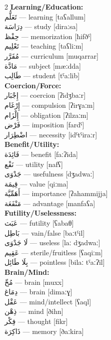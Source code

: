 \documentclass[letterpaper,12pt]{article}
\begin{document}
\begin{multicols}{2}
\textbf{Learning/Education:}\\
\textarabic{تَعَلُّم} — learning [taʕallum]\\
\textarabic{دِرَاسَة} — study [diraːsa]\\
\textarabic{حِفْظ} — memorization [ħifðˤ]\\
\textarabic{تَعْلِيم} — teaching [taʕliːm]\\
\textarabic{مُقَرَّر} — curriculum [muqarrar]\\
\textarabic{مَادَّة} — subject [mæːdda]\\
\textarabic{طَالِب} — student [tˤaːlib]\\[0.5em]

\textbf{Coercion/Force:}\\
\textarabic{إِجْبَار} — coercion [ʔidʒbaːr]\\
\textarabic{إِرْغَام} — compulsion [ʔirɣaːm]\\
\textarabic{إِلْزَام} — obligation [ʔilzaːm]\\
\textarabic{فَرْض} — imposition [fardˤ]\\
\textarabic{اضْطِرَار} — necessity [idˤtˤiraːr]\\[0.5em]

\textbf{Benefit/Utility:}\\
\textarabic{فَائِدَة} — benefit [faːʔida]\\
\textarabic{نَفْع} — utility [nafʕ]\\
\textarabic{جَدْوَى} — usefulness [dʒadwaː]\\
\textarabic{قِيمَة} — value [qiːma]\\
\textarabic{أَهَمِّيَّة} — importance [ʔahammijja]\\
\textarabic{مَنْفَعَة} — advantage [manfaʕa]\\[0.5em]

\textbf{Futility/Uselessness:}\\
\textarabic{عَبَث} — futility [ʕabaθ]\\
\textarabic{بَاطِل} — vain/false [baːtˤil]\\
\textarabic{لَا جَدْوَى} — useless [laː dʒadwaː]\\
\textarabic{عَقِيم} — sterile/fruitless [ʕaqiːm]\\
\textarabic{بِلَا طَائِل} — pointless [bilaː tˤaːʔil]\\[0.5em]

\textbf{Brain/Mind:}\\
\textarabic{مُخّ} — brain [muxx]\\
\textarabic{دِمَاغ} — brain [dimaːɣ]\\
\textarabic{عَقْل} — mind/intellect [ʕaql]\\
\textarabic{ذِهْن} — mind [ðihn]\\
\textarabic{فِكْر} — thought [fikr]\\
\textarabic{ذَاكِرَة} — memory [ðaːkira]\\[0.5em]


\end{multicols}
\end{document}
